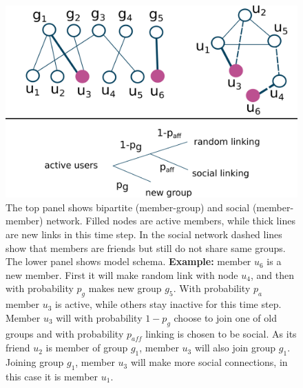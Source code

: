\begin{figure}[H]
	\centering
	\includegraphics[scale=0.5]{Figures/figures/test.png}
	\caption{The top panel shows bipartite (member-group) and social (member-member) network. Filled nodes are active members, while thick lines are new links in this time step. In the social network dashed lines show that members are friends but still do not share same groups. The lower panel shows model schema. \textbf{Example:} member $u_6$ is a new member. First it will make random link  with node $u_4$, and then with probability $p_g$ makes new group $g_5$. With probability $p_a$ member $u_3$ is active, while others stay inactive for this time step. Member $u_3$ will with probability $1-p_g$ choose to join one of old groups and with probability $p_{aff}$ linking is chosen to be social. As its friend $u_2$ is member of group $g_1$, member $u_3$ will also join group $g_1$. Joining group $g_1$, member $u_3$ will make more social connections, in this case it is member $u_1$.}
	\label{fig:schema}
\end{figure}

